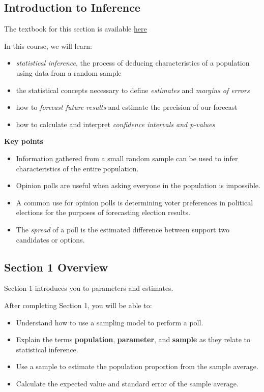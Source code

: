 \documentclass[
]{article}
\providecommand{\tightlist}{%
  \setlength{\itemsep}{0pt}\setlength{\parskip}{0pt}}
\begin{document}
\hypertarget{introduction-to-inference}{%
\subsection{Introduction to Inference}\label{introduction-to-inference}}

The textbook for this section is available
\href{https://rafalab.github.io/dsbook/inference.html\#polls}{here}

In this course, we will learn:

\begin{itemize}
\tightlist
\item
  \emph{statistical inference}, the process of deducing characteristics
  of a population using data from a random sample
\item
  the statistical concepts necessary to define \emph{estimates} and
  \emph{margins of errors}
\item
  how to \emph{forecast future results} and estimate the precision of
  our forecast
\item
  how to calculate and interpret \emph{confidence intervals and
  p-values}
\end{itemize}

\textbf{Key points}

\begin{itemize}
\tightlist
\item
  Information gathered from a small random sample can be used to infer
  characteristics of the entire population.
\item
  Opinion polls are useful when asking everyone in the population is
  impossible.
\item
  A common use for opinion polls is determining voter preferences in
  political elections for the purposes of forecasting election results.
\item
  The \emph{spread} of a poll is the estimated difference between
  support two candidates or options.
\end{itemize}

\hypertarget{section-1-overview}{%
\subsection{Section 1 Overview}\label{section-1-overview}}

Section 1 introduces you to parameters and estimates.

After completing Section 1, you will be able to:

\begin{itemize}
\tightlist
\item
  Understand how to use a sampling model to perform a poll.
\item
  Explain the terms \textbf{population}, \textbf{parameter}, and
  \textbf{sample} as they relate to statistical inference.
\item
  Use a sample to estimate the population proportion from the sample
  average.
\item
  Calculate the expected value and standard error of the sample average.
\end{itemize}
\end{document}
